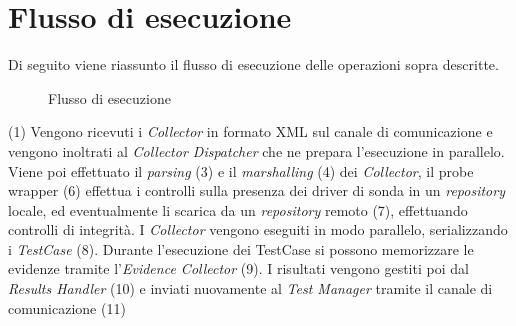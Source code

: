 \documentclass[../main.tex]{subfiles}
\begin{document}
\section{Flusso di esecuzione}
Di seguito viene riassunto il flusso di esecuzione delle operazioni sopra descritte.
\begin{figure}[H]
\centering
{}
\caption{Flusso di esecuzione}\label{fig:ExecutionFlow}
\end{figure}
(1) Vengono ricevuti i \textit{Collector} in formato XML sul canale di comunicazione e vengono inoltrati al \textit{Collector Dispatcher} che ne prepara l'esecuzione in parallelo.
Viene poi effettuato il \textit{parsing} (3) e il \textit{marshalling} (4) dei \textit{Collector}, il probe wrapper (6) effettua i controlli sulla presenza dei driver di sonda in un \textit{repository} locale, ed eventualmente li scarica da un \textit{repository} remoto (7), effettuando controlli di integrità.
I \textit{Collector} vengono eseguiti in modo parallelo, serializzando i \textit{TestCase} (8). Durante l'esecuzione dei TestCase si possono memorizzare le evidenze tramite l'\textit{Evidence Collector} (9). I risultati vengono gestiti poi dal \textit{Results Handler} (10) e inviati nuovamente al \textit{Test Manager} tramite il canale di comunicazione (11)
\end{document}
